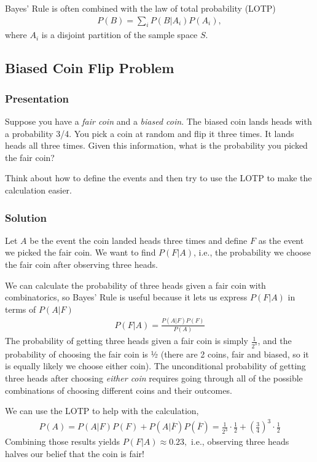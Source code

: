 \documentclass[11pt,a4paper]{article}
\begin{document}
Bayes' Rule is often combined with the law of total probability (LOTP)
\begin{align}
P(B) = \sum_{i}^{}{P\left( B | A_{i} \right)P(A_{i})},
\end{align}
where \(A_{i}\) is a disjoint partition of the sample space \(S\).

\subsection{Biased Coin Flip Problem}

\subsubsection{Presentation}

Suppose you have a \emph{fair coin} 
and a \emph{biased coin}. 
The biased coin lands heads with a probability 3/4. 
You pick a coin at random and flip it three times. 
It lands heads all three times. 
Given this information,
what is the probability you picked the fair coin?

Think about how to define the events and then try to use the LOTP to make the calculation easier.

\newpage
\subsubsection{Solution}

Let \(A\) be the event the coin landed heads three times and define \(F\) as the event we picked the fair coin. 
We want to find \(P(F|A)\), i.e., the probability we choose the fair coin after observing three heads.

We can calculate the probability of three heads given a fair coin with combinatorics, 
so Bayes' Rule is useful because it lets us express \(P(F|A)\) in terms of \(P(A|F)\)
\begin{align}
P\left( F | A \right) = \frac{P\left( A | F \right)P(F)}{P(A)}
\end{align}
The probability of getting three heads given a fair coin is simply \(\frac{1}{2^{3}}\), 
and the probability of choosing the fair coin is ½ (there are 2 coins, fair and biased, 
so it is equally likely we choose either coin). 
The unconditional probability of getting three heads after choosing \emph{either coin} requires 
going through all of the possible combinations of choosing different coins and their outcomes.

We can use the LOTP to help with the calculation,
\begin{align}
P(A) = P\left( A | F \right)P(F) + P\left( A | \overline{F} \right)P\left( \overline{F} \right) = 
\frac{1}{2^{3}} \cdot \frac{1}{2} + \left( \frac{3}{4} \right)^{3} \cdot \frac{1}{2}
\end{align}
Combining those results yields
\(P\left( F | A \right) \approx 0.23,\) i.e., observing three heads
halves our belief that the coin is fair!
\end{document}
